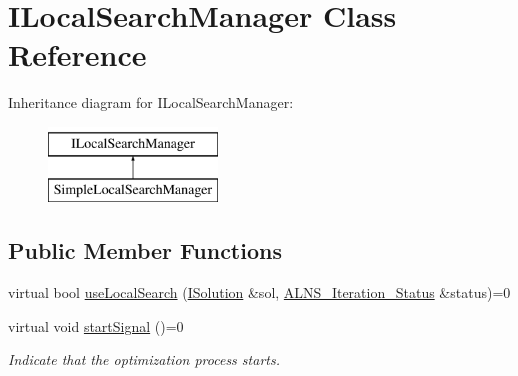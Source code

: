 \hypertarget{classILocalSearchManager}{\section{\-I\-Local\-Search\-Manager \-Class \-Reference}
\label{classILocalSearchManager}
}
\-Inheritance diagram for \-I\-Local\-Search\-Manager\-:\begin{figure}[H]
\begin{center}
\leavevmode
\includegraphics[height=2.000000cm]{classILocalSearchManager}
\end{center}
\end{figure}
\subsection*{\-Public \-Member \-Functions}
\begin{DoxyCompactItemize}
\item 
virtual bool \hyperlink{classILocalSearchManager_ab12f478c7be7163b674374ba478f2cbd}{use\-Local\-Search} (\hyperlink{classISolution}{\-I\-Solution} \&sol, \hyperlink{classALNS__Iteration__Status}{\-A\-L\-N\-S\-\_\-\-Iteration\-\_\-\-Status} \&status)=0
\item 
\hypertarget{classILocalSearchManager_a8a4ff2fd07e7ac3a81eb55e4482f6cf6}{virtual void \hyperlink{classILocalSearchManager_a8a4ff2fd07e7ac3a81eb55e4482f6cf6}{start\-Signal} ()=0}\label{classILocalSearchManager_a8a4ff2fd07e7ac3a81eb55e4482f6cf6}

\begin{DoxyCompactList}\small\item\em \-Indicate that the optimization process starts. \end{DoxyCompactList}\end{DoxyCompactItemize}


